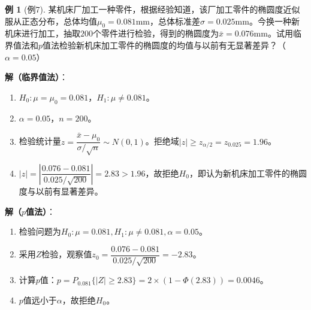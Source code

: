 \documentclass[11pt,a4paper]{report}
\theoremstyle{definition}
\newtheorem{example}{例}[chapter]
\theoremstyle{plain}
\begin{document}
\begin{example}[例7]
某机床厂加工一种零件，根据经验知道，该厂加工零件的椭圆度近似服从正态分布，总体均值$\mu_0=0.081$mm，总体标准差$\sigma=0.025$mm。今换一种新机床进行加工，抽取$200$个零件进行检验，得到的椭圆度为$\bar{x}=0.076$mm。试用临界值法和$p$值法检验新机床加工零件的椭圆度的均值与以前有无显著差异？（$\alpha=0.05$）

\textbf{解（临界值法）}：
\begin{enumerate}[label=步骤\arabic*.,leftmargin=2em]
    \item $H_0:\mu=\mu_0=0.081$，$H_1:\mu\neq 0.081$。
    \item $\alpha=0.05$，$n=200$。
    \item 检验统计量$z=\dfrac{\bar{x}-\mu_0}{\sigma/\sqrt{n}}\sim N(0,1)$。拒绝域$|z|\geq z_{\alpha/2}=z_{0.025}=1.96$。
    \item $|z|=\left|\dfrac{0.076-0.081}{0.025/\sqrt{200}}\right|=2.83>1.96$，故拒绝$H_0$，即认为新机床加工零件的椭圆度与以前有显著差异。
\end{enumerate}

\textbf{解（$p$值法）}：
\begin{enumerate}[label=步骤\arabic*.,leftmargin=2em]
    \item 检验问题为$H_0:\mu=0.081,H_1:\mu\neq 0.081,\alpha=0.05$。
    \item 采用$Z$检验，观察值$z_0=\dfrac{0.076-0.081}{0.025/\sqrt{200}}=-2.83$。
    \item 计算$p$值：$p=P_{0.081}\{|Z|\geq 2.83\}=2\times(1-\Phi(2.83))=0.0046$。
    \item $p$值远小于$\alpha$，故拒绝$H_0$。
\end{enumerate}
\end{example}
\end{document}
